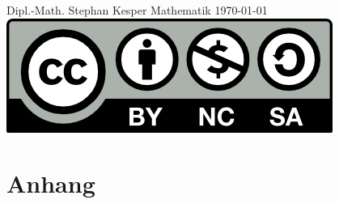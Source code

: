\documentclass[]{memoir}
\begin{document}
\frontmatter

\thispagestyle{empty}
\begin{center}
{\Large Dipl.-Math. Stephan Kesper}
\vskip 4cm
{\fontsize{48}{52} \selectfont Mathematik}
\vskip 6cm
\today
\vfill
\includegraphics{../../../License/by-nc-sa.png}
\end{center}
\newpage




\tableofcontents

\newpage

\listoffigures


\mainmatter


















%
%













\appendix
\part{Anhang}





\backmatter





\printindex
\end{document}
